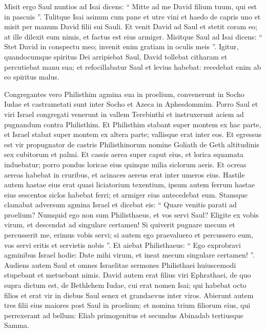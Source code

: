 \begin{biblechapter}
\begin{biblechapter}
\begin{biblechapter}
\begin{biblechapter}
\begin{biblechapter}
\begin{biblechapter}
\begin{biblechapter}
\begin{biblechapter}
\begin{biblechapter}
\begin{biblechapter}
\begin{biblechapter}
\begin{biblechapter}
\begin{biblechapter}
\begin{biblechapter}
\begin{biblechapter}
\begin{biblechapter}
\verse Misit ergo Saul nuntios ad Isai dicens: “ Mitte ad me David filium tuum, qui est in pascuis ”. 
\verse Tulitque Isai asinum cum pane et utre vini et haedo de capris uno et misit per manum David filii sui Sauli. 
\verse Et venit David ad Saul et stetit coram eo; at ille dilexit eum nimis, et factus est eius armiger. 
\verse Misitque Saul ad Isai dicens: “ Stet David in conspectu meo; invenit enim gratiam in oculis meis ”. 
 \verse Igitur, quandocumque spiritus Dei arripiebat Saul, David tollebat citharam et percutiebat manu sua; et refocillabatur Saul et levius habebat: recedebat enim ab eo spiritus malus.
 
\begin{biblechapter}
\verse Congregantes vero Philisthim agmina sua in proelium, convenerunt in Socho Iudae et castrametati sunt inter Socho et Azeca in Aphesdommim. 
\verse Porro Saul et viri Israel congregati venerunt in vallem Terebinthi et instruxerunt aciem ad pugnandum contra Philisthim. 
\verse Et Philisthim stabant super montem ex hac parte, et Israel stabat super montem ex altera parte; vallisque erat inter eos.
 \verse Et egressus est vir propugnator de castris Philisthinorum nomine Goliath de Geth altitudinis sex cubitorum et palmi. 
\verse Et cassis aerea super caput eius, et lorica squamata induebatur; porro pondus loricae eius quinque milia siclorum aeris. 
\verse Et ocreas aereas habebat in cruribus, et acinaces aereus erat inter umeros eius. 
\verse Hastile autem hastae eius erat quasi liciatorium texentium, ipsum autem ferrum hastae eius sescentos siclos habebat ferri; et armiger eius antecedebat eum. 
\verse Stansque clamabat adversum agmina Israel et dicebat eis: “ Quare venitis parati ad proelium? Numquid ego non sum Philisthaeus, et vos servi Saul? Eligite ex vobis virum, et descendat ad singulare certamen! 
\verse Si quiverit pugnare mecum et percusserit me, erimus vobis servi; si autem ego praevaluero et percussero eum, vos servi eritis et servietis nobis ”. 
\verse Et aiebat Philisthaeus: “ Ego exprobravi agminibus Israel hodie: Date mihi virum, et ineat mecum singulare certamen! ”.
 \verse Audiens autem Saul et omnes Israelitae sermones Philisthaei huiuscemodi stupebant et metuebant nimis.
 \verse David autem erat filius viri Ephrathaei, de quo supra dictum est, de Bethlehem Iudae, cui erat nomen Isai; qui habebat octo filios et erat vir in diebus Saul senex et grandaevus inter viros. 
\verse Abierunt autem tres filii eius maiores post Saul in proelium; et nomina trium filiorum eius, qui perrexerant ad bellum: Eliab primogenitus et secundus Abinadab tertiusque Samma. 

\end{biblechapter}
\end{biblechapter}
\end{biblechapter}
\end{biblechapter}
\end{biblechapter}
\end{biblechapter}
\end{biblechapter}
\end{biblechapter}
\end{biblechapter}
\end{biblechapter}
\end{biblechapter}
\end{biblechapter}
\end{biblechapter}
\end{biblechapter}
\end{biblechapter}
\end{biblechapter}
\end{biblechapter}
